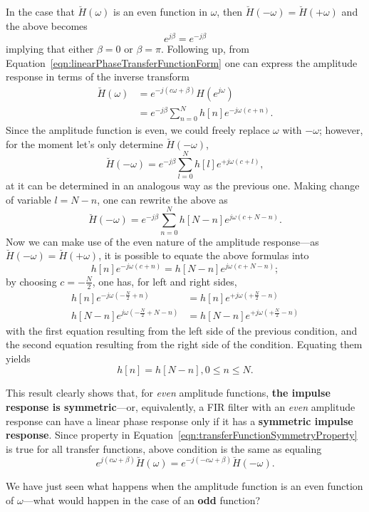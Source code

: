 \documentclass[\documentfontsize, twocolumn]{\classname}
\begin{document}
In the case that $\breve{H}(\omega)$ is an even function in $\omega$, then $\breve{H}(-\omega) = \breve{H}(+\omega)$ and the above becomes
\[
    e^{j\beta} = e^{-j\beta}
\]
implying that either $\beta = 0$ or $\beta = \pi$. Following up, from Equation~\ref{eqn:linearPhaseTransferFunctionForm} one can express the amplitude response in terms of the inverse transform
\begin{align*}
    \breve{H}(\omega) &= e^{-j(c\omega + \beta)}H(e^{j\omega})\\
                      &= e^{-j\beta}\sum_{n=0}^N h[n]e^{-j\omega(c + n)}.
\end{align*}
Since the amplitude function is even, we could freely replace $\omega$ with $-\omega$; however, for the moment let's only determine $\breve{H}(-\omega)$,
\[
    \breve{H}(-\omega) = e^{-j\beta}\sum_{l=0}^N h[l]e^{+j\omega(c + l)},
\]
at it can be determined in an analogous way as the previous one.
Making change of variable $l = N - n$, one can rewrite the above as
\[
    \breve{H}(-\omega) = e^{-j\beta}\sum_{n=0}^N h[N - n]e^{j\omega(c + N - n)}.
\]
Now we can make use of the even nature of the amplitude response---as $\breve{H}(-\omega) = \breve{H}(+\omega)$, it is possible to equate the above formulas into
\[
    h[n]e^{-j\omega(c+n)} = h[N-n]e^{j\omega(c + N - n)};
\]
by choosing $c = -\frac N 2$, one has, for left and right sides,
\begin{align*}
    h[n]e^{-j\omega(-\frac N 2 + n)} &= h[n]e^{+j\omega(+\frac N 2 - n)}\\
    h[N - n]e^{j\omega(-\frac N 2 + N - n)} &= h[N - n]e^{+j\omega(+\frac N 2 - n)}
\end{align*}
with the first equation resulting from the left side of the previous condition, and the second equation resulting from the right side of the condition. Equating them yields
\[
    h[n] = h[N-n], 0 \leq n \leq N.
\]

This result clearly shows that, for \emph{even} amplitude functions, \textbf{the impulse response is symmetric}---or, equivalently, a FIR filter with an \emph{even} amplitude response can have a linear phase response only if it has a \textbf{symmetric impulse response}. Since property in Equation~\ref{eqn:transferFunctionSymmetryProperty} is true for all transfer functions, above condition is the same as equaling
\[
    e^{j(c\omega + \beta)}\breve{H}(\omega) = e^{-j(-c\omega + \beta)}\breve{H}(-\omega).
\]

We have just seen what happens when the amplitude function is an even function of $\omega$---what would happen in the case of an \textbf{odd} function?
\end{document}
